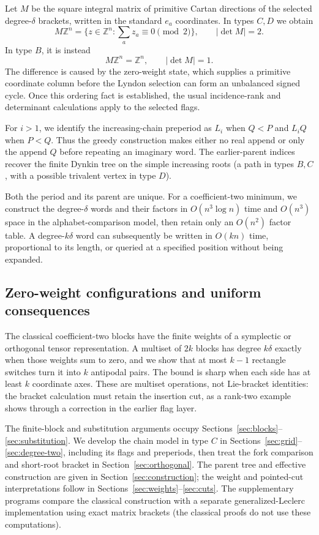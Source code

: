 \documentclass[11pt]{amsart}
\numberwithin{equation}{section}
\theoremstyle{definition}
\newcommand{\Z}{\mathbb Z}
\begin{document}
Let $M$ be the square integral matrix of primitive Cartan directions of the selected degree-$\delta$ brackets, written in the standard $e_a$ coordinates. In types $C,D$ we obtain
\[
 M\Z^n=\{z\in\Z^n:\textstyle\sum_a z_a\equiv0\pmod2\},
 \qquad |\det M|=2.
\]
In type $B$, it is instead
\[
 M\Z^n=\Z^n,\qquad |\det M|=1.
\]
The difference is caused by the zero-weight state, which supplies a primitive coordinate column before the Lyndon selection can form an unbalanced signed cycle. Once this ordering fact is established, the usual incidence-rank and determinant calculations apply to the selected flags.

For $i>1$, we identify the increasing-chain preperiod as $L_i$ when $Q<P$ and $L_iQ$ when $P<Q$. Thus the greedy construction makes either no real append or only the append $Q$ before repeating an imaginary word. The earlier-parent indices recover the finite Dynkin tree on the simple increasing roots (a path in types $B,C$, with a possible trivalent vertex in type $D$).

Both the period and its parent are unique. For a coefficient-two minimum, we construct the degree-$\delta$ words and their factors in $O(n^3\log n)$ time and $O(n^3)$ space in the alphabet-comparison model, then retain only an $O(n^2)$ factor table. A degree-$k\delta$ word can subsequently be written in $O(kn)$ time, proportional to its length, or queried at a specified position without being expanded.

\subsection{Zero-weight configurations and uniform consequences}
The classical coefficient-two blocks have the finite weights of a symplectic or orthogonal tensor representation. A multiset of $2k$ blocks has degree $k\delta$ exactly when those weights sum to zero, and we show that at most $k-1$ rectangle switches turn it into $k$ antipodal pairs. The bound is sharp when each side has at least $k$ coordinate axes. These are multiset operations, not Lie-bracket identities: the bracket calculation must retain the insertion cut, as a rank-two example shows through a correction in the earlier flag layer.

The finite-block and substitution arguments occupy Sections~\ref{sec:blocks}--\ref{sec:substitution}. We develop the chain model in type $C$ in Sections~\ref{sec:grid}--\ref{sec:degree-two}, including its flags and preperiods, then treat the fork comparison and short-root bracket in Section~\ref{sec:orthogonal}. The parent tree and effective construction are given in Section~\ref{sec:construction}; the weight and pointed-cut interpretations follow in Sections~\ref{sec:weights}--\ref{sec:cuts}. The supplementary programs compare the classical construction with a separate generalized-Leclerc implementation using exact matrix brackets (the classical proofs do not use these computations).
\end{document}
